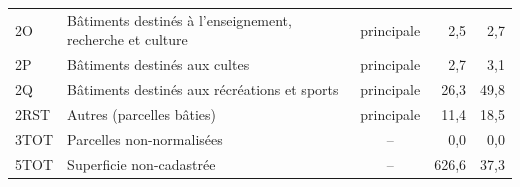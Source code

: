 \begin{tabular}{llcrr}
2O & Bâtiments destinés à l’enseignement, recherche et culture & principale & 2{,}5 & \textminus{}2{,}7 \\
2P & Bâtiments destinés aux cultes & principale & \textminus{}2{,}7 & \textminus{}3{,}1 \\
2Q & Bâtiments destinés aux récréations et sports & principale & 26{,}3 & 49{,}8 \\
2RST & Autres (parcelles bâties) & principale & 11{,}4 & 18{,}5 \\
3TOT & Parcelles non-normalisées & -- & 0{,}0 & 0{,}0 \\
5TOT & Superficie non-cadastrée & -- & 626{,}6 & 37{,}3 \\
\bottomrule
\end{tabular}
